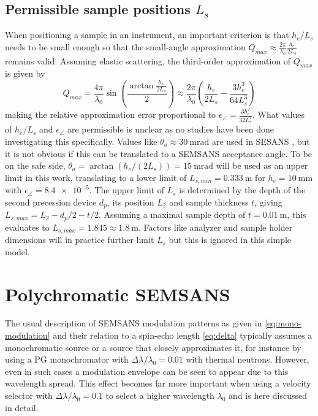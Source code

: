 \subsection{Permissible sample positions $L_s$}
When positioning a sample in an instrument, an important criterion is that $h_e/L_s$ needs to be small enough so that the small-angle approximation $Q_{max} \approx \frac{2\pi}{\lambda_0}\frac{h_e}{2L_s}$ remains valid. Assuming elastic scattering, the third-order approximation of $Q_{max}$ is given by
$$Q_{max} = \frac{4\pi}{\lambda_0}\sin(\frac{\arctan\frac{h_e}{2L_s}}{2}) \approx  \frac{2\pi}{\lambda_0}(\frac{h_e}{2L_s} - \frac{3h_e^3}{64L_s^3})$$
making the relative approximation error proportional to $\epsilon_\angle = \frac{3h_e^2}{32L_s^2}$. What values of $h_e/L_s$ and $\epsilon_\angle$ are permissible is unclear as no studies have been done investigating this specifically. Values like $\theta_a \approx \SI{30}{\milli\radian}$ are used in SESANS \cite{rekveldt1996}, but it is not obvious if this can be translated to a SEMSANS acceptance angle. To be on the safe side, $\theta_a = \arctan\left(h_e / (2L_s)\right) = \SI{15}{\milli\radian}$ will be used as an upper limit in this work, translating to a lower limit of $L_{s,min} = \SI{0.333}{\meter}$ for $h_e = \SI{10}{\milli\meter}$ with $\epsilon_\angle = \num{8.4e-5}$. 
The upper limit of $L_s$ is determined by the depth of the second precession device $d_p$, its position $L_2$ and sample thickness $t$, giving $L_{s,max} = L_2 - d_p / 2 - t/2$. Assuming a maximal sample depth of $t=\SI{0.01}{\meter}$, this evaluates to $L_{s,max} = 1.845 \approx \SI{1.8}{\meter}$. Factors like analyzer and sample holder dimensions will in practice further limit $L_s$ but this is ignored in this simple model.
\section{Polychromatic SEMSANS}
\label{c3.6}
The usual description of SEMSANS modulation patterns as given in \eqref{eq:mono-modulation} and their relation to a spin-echo length \eqref{eq:delta} typically assumes a monochromatic source or a source that closely approximates it, for instance by using a PG monochromator with $\Delta\lambda/\lambda_0 = 0.01$ with thermal neutrons. However, even in such cases a modulation envelope can be seen to appear \cite{bouwman2021} due to this wavelength spread. This effect becomes far more important when using a velocity selector with $\Delta\lambda/\lambda_0 = 0.1$ to select a higher wavelength $\lambda_0$ and is here discussed in detail.
